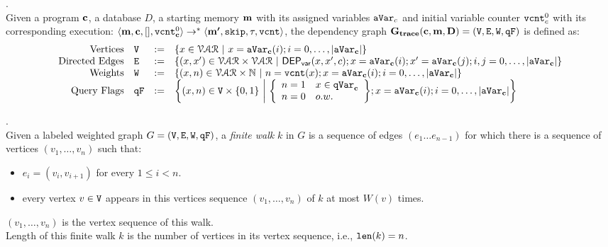 \begin{defn}.
\\
Given a program ${\boldsymbol{\mathbf{c}}}$, a database $D$, a starting memory ${\boldsymbol{\mathbf{m}}}$ with its assigned variables $\mathtt{aVar}_c$ and initial variable counter $\mathtt{vcnt}^0_{c}$ with its corresponding execution:
$\langle {\boldsymbol{\mathbf{m}}}, {\boldsymbol{\mathbf{c}}}, [], \mathtt{vcnt}^0_{{\boldsymbol{\mathbf{c}}}} \rangle 
\to^{*}
\langle {\boldsymbol{\mathbf{m'}}}, \mathtt{skip}, \mathtt{\tau}, \mathtt{vcnt} \rangle$,
the dependency graph $\bf{G_{trace}}({\boldsymbol{\mathbf{c}}}, {\boldsymbol{\mathbf{m}}}, D) = (\mathtt{V}, \mathtt{E}, \mathtt{W}, \mathtt{qF})$ is defined as:
%
\[
\begin{array}{rlcl}
  \text{Vertices} &
  \vertxs & := & \left\{ 
  x \in \mathcal{VAR}
  ~ \middle\vert ~
  x = \avar_{\ssa{c}}(i); i = 0, \ldots, |\avar_{\ssa{c}}| 
  \right\}
  \\
  \text{Directed Edges} &
  \edges & := & 
  \left\{ 
  (x, x') \in \mathcal{VAR} \times \mathcal{VAR}
  ~ \middle\vert ~
  \vardep(x, x', c); 
  x = \avar_{\ssa{c}}(i); x' = \avar_{\ssa{c}}(j); i,j = 0, \ldots, |\avar_{\ssa{c}}| 
  \right\}
  \\
  \text{Weights} &
  \weights & := & 
  \left\{ 
  (x, n) \in \mathcal{VAR} \times \mathbb{N}
  ~ \middle\vert ~
  n = \vcounter(x); x = \avar_{\ssa{c}}(i); i = 0, \ldots, |\avar_{\ssa{c}}|
  \right\}
  \\
  \text{Query Flags} &
  \qflag & := & 
  \left\{(x, n)  \in \vertxs \times \{0, 1\} 
  ~ \middle\vert ~
  \left\{
  \begin{array}{ll}
  n = 1 & x \in \qvar_{\ssa{c}} \\ 
  n = 0 & o.w.
  \end{array}
  \right\};
  x = \avar_{\ssa{c}}(i); i = 0, \ldots, |\avar_{\ssa{c}}|
  \right\}
\end{array}
\]
\end{defn}
%
%
\begin{defn}.
\label{def:finitewalk}
\\
Given a labeled weighted graph $G = (\mathtt{V}, \mathtt{E}, \mathtt{W}, \mathtt{qF})$, a \emph{finite walk} $k$ in $G$ is a sequence of edges $(e_1 \ldots e_{n - 1})$ 
for which there is a sequence of vertices $(v_1, \ldots, v_{n})$ such that:
\begin{itemize}
    \item $e_i = (v_{i},v_{i + 1})$ for every $1 \leq i < n$.
    \item every vertex $v \in \mathtt{V}$ appears in this vertices sequence $(v_1, \ldots, v_{n})$ of $k$ at most $W(v)$ times.  
\end{itemize}
$(v_1, \ldots, v_{n})$ is the vertex sequence of this walk.
\\
%
Length of this finite walk $k$ is the number of vertices in its vertex sequence, i.e., $\mathtt{len}(k) = n$.
\end{defn}
